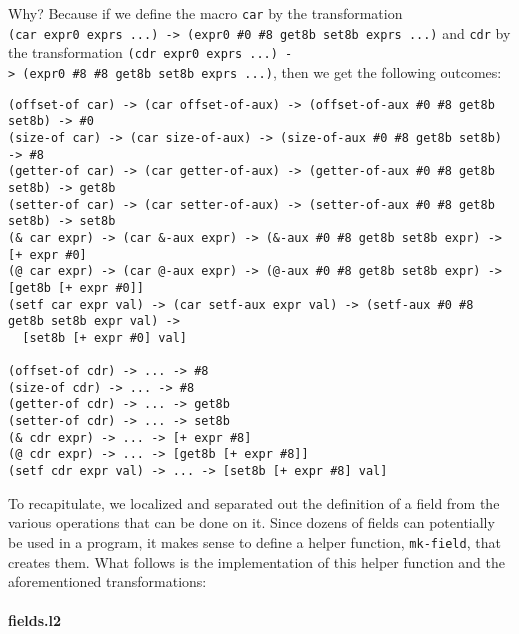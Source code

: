 \documentclass[]{article}
\let\oldparagraph\paragraph
\renewcommand{\paragraph}[1]{\oldparagraph{#1}\mbox{}}
\begin{document}
Why? Because if we define the macro \texttt{car} by the transformation
\texttt{(car\ expr0\ exprs\ ...)\ -\textgreater{}\ (expr0\ \#0\ \#8\ get8b\ set8b\ exprs\ ...)}
and \texttt{cdr} by the transformation
\texttt{(cdr\ expr0\ exprs\ ...)\ -\textgreater{}\ (expr0\ \#8\ \#8\ get8b\ set8b\ exprs\ ...)},
then we get the following outcomes:

\begin{verbatim}
(offset-of car) -> (car offset-of-aux) -> (offset-of-aux #0 #8 get8b set8b) -> #0
(size-of car) -> (car size-of-aux) -> (size-of-aux #0 #8 get8b set8b) -> #8
(getter-of car) -> (car getter-of-aux) -> (getter-of-aux #0 #8 get8b set8b) -> get8b
(setter-of car) -> (car setter-of-aux) -> (setter-of-aux #0 #8 get8b set8b) -> set8b
(& car expr) -> (car &-aux expr) -> (&-aux #0 #8 get8b set8b expr) -> [+ expr #0]
(@ car expr) -> (car @-aux expr) -> (@-aux #0 #8 get8b set8b expr) -> [get8b [+ expr #0]]
(setf car expr val) -> (car setf-aux expr val) -> (setf-aux #0 #8 get8b set8b expr val) ->
  [set8b [+ expr #0] val]

(offset-of cdr) -> ... -> #8
(size-of cdr) -> ... -> #8
(getter-of cdr) -> ... -> get8b
(setter-of cdr) -> ... -> set8b
(& cdr expr) -> ... -> [+ expr #8]
(@ cdr expr) -> ... -> [get8b [+ expr #8]]
(setf cdr expr val) -> ... -> [set8b [+ expr #8] val]
\end{verbatim}

To recapitulate, we localized and separated out the definition of a
field from the various operations that can be done on it. Since dozens
of fields can potentially be used in a program, it makes sense to define
a helper function, \texttt{mk-field}, that creates them. What follows is
the implementation of this helper function and the aforementioned
transformations:

\paragraph{fields.l2}\label{fields.l2}
\end{document}
